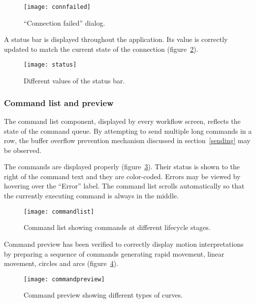 \begin{figure}[ht]
    \begin{center}
        \texttt{[image: connfailed]}
        \caption{``Connection failed'' dialog.}
        \label{connfailed}
    \end{center}
\end{figure}

A status bar is displayed throughout the application. Its value is correctly
updated to match the current state of the connection (figure~\ref{status}).

\begin{figure}[ht]
    \begin{center}
        \texttt{[image: status]}
        \caption{Different values of the status bar.}
        \label{status}
    \end{center}
\end{figure}

\subsubsection{Command list and preview}

The command list component, displayed by every workflow screen, reflects the
state of the command queue. By attempting to send multiple long commands in a
row, the buffer overflow prevention mechanism discussed in section~\ref{sending}
may be observed.

The commands are displayed properly (figure~\ref{commandlist}). Their status is
shown to the right of the command text and they are color-coded. Errors may be
viewed by hovering over the ``Error'' label. The command list scrolls
automatically so that the currently executing command is always in the middle.

\begin{figure}[ht]
    \begin{center}
        \texttt{[image: commandlist]}
        \caption{Command list showing commands at different lifecycle stages.}
        \label{commandlist}
    \end{center}
\end{figure}

Command preview has been verified to correctly display motion interpretations
by preparing a sequence of commands generating rapid movement, linear movement,
circles and arcs (figure~\ref{commandpreview}).

\begin{figure}[ht]
    \begin{center}
        \texttt{[image: commandpreview]}
        \caption{Command preview showing different types of curves.}
        \label{commandpreview}
    \end{center}
\end{figure}

